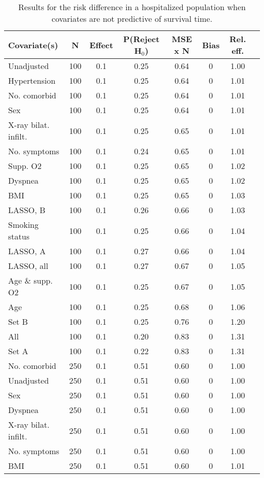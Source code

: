 \documentclass{article}
\begin{document}
{\tabcolsep=6pt  %
\begin{longtable}{lccccccc}
\caption{Results for the risk difference in a hospitalized population when covariates are not predictive of survival time.}\label{tab12}\\
Covariate(s) & N & Effect & P(Reject H$_0$) & MSE x N & Bias & Rel. eff.\\ \midrule
Unadjusted & 100 & 0.1 & 0.25 & 0.64 & 0 & 1.00\\
Hypertension & 100 & 0.1 & 0.25 & 0.64 & 0 & 1.01\\
No. comorbid & 100 & 0.1 & 0.25 & 0.64 & 0 & 1.01\\
Sex & 100 & 0.1 & 0.25 & 0.64 & 0 & 1.01\\
X-ray bilat. infilt. & 100 & 0.1 & 0.25 & 0.65 & 0 & 1.01\\
No. symptoms & 100 & 0.1 & 0.24 & 0.65 & 0 & 1.01\\
Supp. O2 & 100 & 0.1 & 0.25 & 0.65 & 0 & 1.02\\
Dyspnea & 100 & 0.1 & 0.25 & 0.65 & 0 & 1.02\\
BMI & 100 & 0.1 & 0.25 & 0.65 & 0 & 1.03\\
LASSO, B & 100 & 0.1 & 0.26 & 0.66 & 0 & 1.03\\
Smoking status & 100 & 0.1 & 0.25 & 0.66 & 0 & 1.04\\
LASSO, A & 100 & 0.1 & 0.27 & 0.66 & 0 & 1.04\\
LASSO, all & 100 & 0.1 & 0.27 & 0.67 & 0 & 1.05\\
Age \& supp. O2 & 100 & 0.1 & 0.25 & 0.67 & 0 & 1.05\\
Age & 100 & 0.1 & 0.25 & 0.68 & 0 & 1.06\\
Set B & 100 & 0.1 & 0.25 & 0.76 & 0 & 1.20\\
All & 100 & 0.1 & 0.20 & 0.83 & 0 & 1.31\\
Set A & 100 & 0.1 & 0.22 & 0.83 & 0 & 1.31\\ \midrule
No. comorbid & 250 & 0.1 & 0.51 & 0.60 & 0 & 1.00\\
Unadjusted & 250 & 0.1 & 0.51 & 0.60 & 0 & 1.00\\
Sex & 250 & 0.1 & 0.51 & 0.60 & 0 & 1.00\\
Dyspnea & 250 & 0.1 & 0.51 & 0.60 & 0 & 1.00\\
X-ray bilat. infilt. & 250 & 0.1 & 0.51 & 0.60 & 0 & 1.00\\
No. symptoms & 250 & 0.1 & 0.51 & 0.60 & 0 & 1.00\\
BMI & 250 & 0.1 & 0.51 & 0.60 & 0 & 1.01\\

\end{longtable}}
\end{document}
